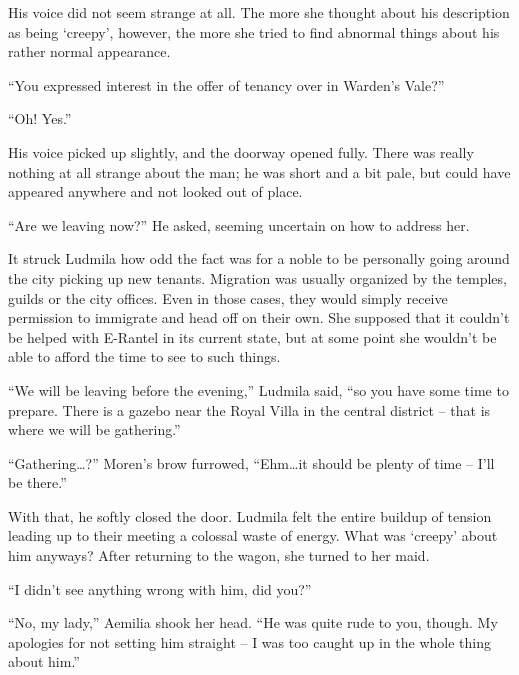 His voice did not seem strange at all. The more she thought about his description as being ‘creepy’, however, the more she tried to find abnormal things about his rather normal appearance.

 

“You expressed interest in the offer of tenancy over in Warden’s Vale?”

 

“Oh! Yes.”

 

His voice picked up slightly, and the doorway opened fully. There was really nothing at all strange about the man; he was short and a bit pale, but could have appeared anywhere and not looked out of place.

 

“Are we leaving now?” He asked, seeming uncertain on how to address her.

 

It struck Ludmila how odd the fact was for a noble to be personally going around the city picking up new tenants. Migration was usually organized by the temples, guilds or the city offices. Even in those cases, they would simply receive permission to immigrate and head off on their own. She supposed that it couldn’t be helped with E-Rantel in its current state, but at some point she wouldn’t be able to afford the time to see to such things.

 

“We will be leaving before the evening,” Ludmila said, “so you have some time to prepare. There is a gazebo near the Royal Villa in the central district – that is where we will be gathering.”

 

“Gathering…?” Moren’s brow furrowed, “Ehm…it should be plenty of time – I’ll be there.”

 

With that, he softly closed the door. Ludmila felt the entire buildup of tension leading up to their meeting a colossal waste of energy. What was ‘creepy’ about him anyways? After returning to the wagon, she turned to her maid.

 

“I didn’t see anything wrong with him, did you?”

 

“No, my lady,” Aemilia shook her head. “He was quite rude to you, though. My apologies for not setting him straight – I was too caught up in the whole thing about him.”

